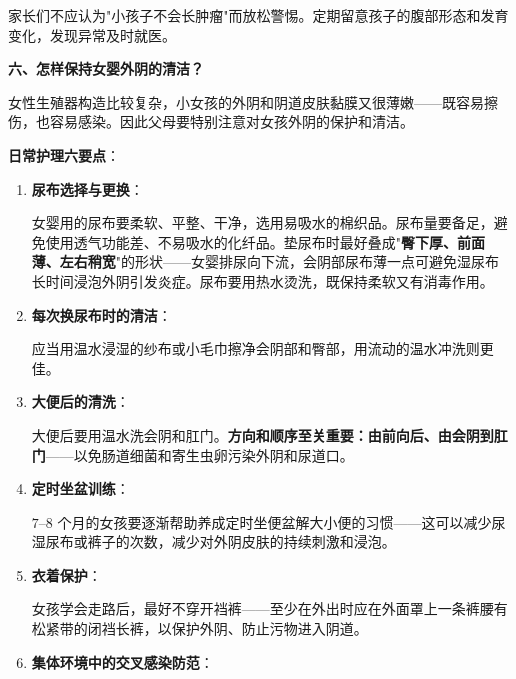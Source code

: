 \begin{enumerate}
\begin{tcolorbox}[colback=pink!5!white,colframe=red!50!black,title=贴心小叮咛]
家长们不应认为"小孩子不会长肿瘤"而放松警惕。定期留意孩子的腹部形态和发育变化，发现异常及时就医。
\end{tcolorbox}

\vspace{0.8em}
\noindent\textbf{六、怎样保持女婴外阴的清洁？}

女性生殖器构造比较复杂，小女孩的外阴和阴道皮肤黏膜又很薄嫩——既容易擦伤，也容易感染。因此父母要特别注意对女孩外阴的保护和清洁。

\vspace{0.5em}
\noindent\textbf{日常护理六要点}：

\begin{enumerate}
	\item \textbf{尿布选择与更换}：

女婴用的尿布要柔软、平整、干净，选用易吸水的棉织品。尿布量要备足，避免使用透气功能差、不易吸水的化纤品。垫尿布时最好叠成"\textbf{臀下厚、前面薄、左右稍宽}"的形状——女婴排尿向下流，会阴部尿布薄一点可避免湿尿布长时间浸泡外阴引发炎症。尿布要用热水烫洗，既保持柔软又有消毒作用。

\vspace{0.3em}
	\item \textbf{每次换尿布时的清洁}：

应当用温水浸湿的纱布或小毛巾擦净会阴部和臀部，用流动的温水冲洗则更佳。

\vspace{0.3em}
	\item \textbf{大便后的清洗}：

大便后要用温水洗会阴和肛门。\textbf{方向和顺序至关重要：由前向后、由会阴到肛门}——以免肠道细菌和寄生虫卵污染外阴和尿道口。

\vspace{0.3em}
	\item \textbf{定时坐盆训练}：

$7$--$8$ 个月的女孩要逐渐帮助养成定时坐便盆解大小便的习惯——这可以减少尿湿尿布或裤子的次数，减少对外阴皮肤的持续刺激和浸泡。

\vspace{0.3em}
	\item \textbf{衣着保护}：

女孩学会走路后，最好不穿开裆裤——至少在外出时应在外面罩上一条裤腰有松紧带的闭裆长裤，以保护外阴、防止污物进入阴道。

\vspace{0.3em}
	\item \textbf{集体环境中的交叉感染防范}：


\end{enumerate}
\end{enumerate}
